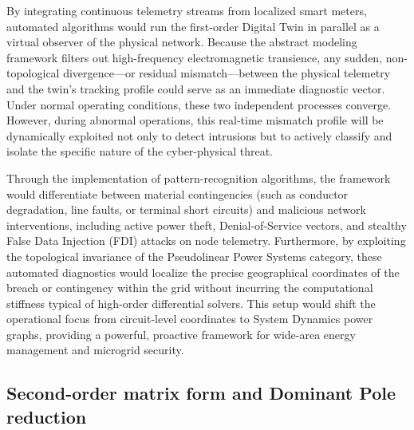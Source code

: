 \documentclass[energies,accept,oneauthor,pdftex]{Definitions/mdpi}
\begin{document}
By integrating continuous telemetry streams from localized smart meters, automated algorithms would run the first-order Digital Twin in parallel as a virtual observer of the physical network. Because the abstract modeling framework filters out high-frequency electromagnetic transience, any sudden, non-topological divergence—or residual mismatch—between the physical telemetry and the twin's tracking profile could serve as an immediate diagnostic vector. Under normal operating conditions, these two independent processes converge. However, during abnormal operations, this real-time mismatch profile will be dynamically exploited not only to detect intrusions but to actively classify and isolate the specific nature of the cyber-physical threat.

Through the implementation of pattern-recognition algorithms, the framework would differentiate between material contingencies (such as conductor degradation, line faults, or terminal short circuits) and malicious network interventions, including active power theft, Denial-of-Service vectors, and stealthy False Data Injection (FDI) attacks on node telemetry. Furthermore, by exploiting the topological invariance of the Pseudolinear Power Systems category, these automated diagnostics would localize the precise geographical coordinates of the breach or contingency within the grid without incurring the computational stiffness typical of high-order differential solvers. This setup would shift the operational focus from circuit-level coordinates to System Dynamics power graphs, providing a powerful, proactive framework for wide-area energy management and microgrid security.





\subsection{Second-order matrix form and Dominant Pole reduction}
\end{document}
